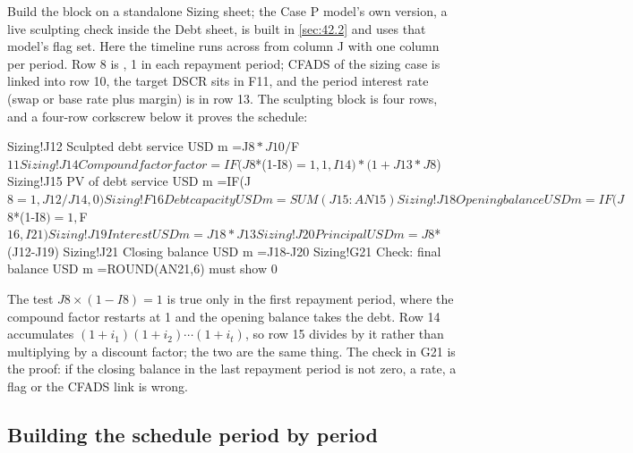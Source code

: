 Build the block on a standalone Sizing sheet; the Case P model's own version, a live sculpting check inside the Debt sheet, is built in \cref{sec:42.2} and uses that model's flag set. Here the timeline runs across from column J with one column per period. Row 8 is , 1 in each repayment period; CFADS of the sizing case is linked into row 10, the target DSCR sits in F11, and the period interest rate (swap or base rate plus margin) is in row 13. The sculpting block is four rows, and a four-row corkscrew below it proves the schedule:
\begin{excel}
Sizing!J12   Sculpted debt service    USD m    =J$8*J10/$F$11
Sizing!J14   Compound factor          factor   =IF(J$8*(1-I$8)=1,1,I14)*(1+J13*J$8)
Sizing!J15   PV of debt service       USD m    =IF(J$8=1,J12/J14,0)
Sizing!F16   Debt capacity            USD m    =SUM(J15:AN15)
Sizing!J18   Opening balance          USD m    =IF(J$8*(1-I$8)=1,$F$16,I21)
Sizing!J19   Interest                 USD m    =J18*J13
Sizing!J20   Principal                USD m    =J$8*(J12-J19)
Sizing!J21   Closing balance          USD m    =J18-J20
Sizing!G21   Check: final balance     USD m    =ROUND(AN21,6)     must show 0
\end{excel}
The test $J8 \times (1 - I8) = 1$ is true only in the first repayment period, where the compound factor restarts at 1 and the opening balance takes the debt. Row 14 accumulates $(1+i_1)(1+i_2)\cdots(1+i_t)$, so row 15 divides by it rather than multiplying by a discount factor; the two are the same thing. The check in G21 is the proof: if the closing balance in the last repayment period is not zero, a rate, a flag or the CFADS link is wrong.

\subsection{Building the schedule period by period}\label{ssec:36.2.2}

